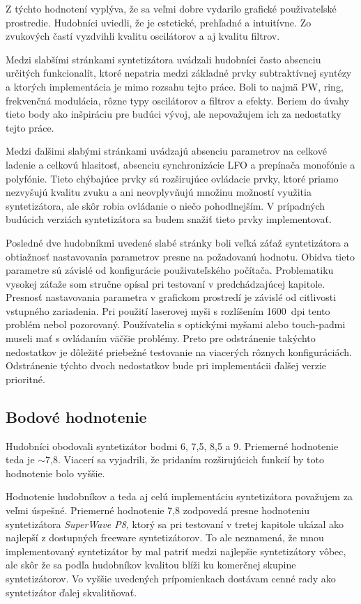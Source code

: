 Z týchto hodnotení vyplýva, že sa veľmi dobre vydarilo grafické použivateľské prostredie. Hudobníci uviedli, že je estetické, prehľadné a intuitívne. Zo zvukových častí vyzdvihli kvalitu oscilátorov a aj kvalitu filtrov. 

Medzi slabšími stránkami syntetizátora uvádzali hudobníci často absenciu určitých funkcionalít, ktoré nepatria medzi základné prvky subtraktívnej syntézy a ktorých implementácia je mimo rozsahu tejto práce. Boli to najmä PW, ring, frekvenčná modulácia, rôzne typy oscilátorov a filtrov a efekty. Beriem do úvahy tieto body ako inšpiráciu pre budúci vývoj, ale nepovažujem ich za nedostatky tejto práce.

Medzi ďalšimi slabými stránkami uvádzajú absenciu parametrov na celkové ladenie a celkovú hlasitosť, absenciu synchronizácie LFO a prepínača monofónie a polyfónie. Tieto chýbajúce prvky sú rozširujúce ovládacie prvky, ktoré priamo nezvyšujú kvalitu zvuku a ani neovplyvňujú množinu možností využitia syntetizátora, ale skôr robia ovládanie o niečo pohodlnejším. V prípadných budúcich verziách syntetizátora sa budem snažiť tieto prvky implementovať.

Posledné dve hudobníkmi uvedené slabé stránky boli veľká záťaž syntetizátora a obtiažnosť nastavovania parametrov presne na požadovanú hodnotu. Obidva tieto parametre sú závislé od konfigurácie použivateľského počítača. Problematiku vysokej záťaže som stručne opísal pri testovaní v predchádzajúcej kapitole. Presnosť nastavovania parametra v grafickom prostredí je závislé od citlivosti vstupného zariadenia. Pri použití laserovej myši s rozlíšením 1600~dpi tento problém nebol pozorovaný. Používatelia s optickými myšami alebo touch-padmi museli mať s ovládaním väčšie problémy. Preto pre odstránenie takýchto nedostatkov je dôležité priebežné testovanie na viacerých rôznych konfiguráciách. Odstránenie týchto dvoch nedostatkov bude pri implementácii ďalšej verzie prioritné.

\subsection{Bodové hodnotenie}

Hudobníci obodovali syntetizátor bodmi 6, 7,5, 8,5 a 9. Priemerné hodnotenie teda je $\sim$7,8. Viacerí sa vyjadrili, že pridaním rozširujúcich funkcií by toto hodnotenie bolo vyššie. 

Hodnotenie hudobníkov a teda aj celú implementáciu syntetizátora považujem za veľmi úspešné. Priemerné hodnotenie 7,8 zodpovedá presne hodnoteniu syntetizátora \emph{SuperWave P8}, ktorý sa pri testovaní v tretej kapitole ukázal ako najlepší z dostupných freeware syntetizátorov. To ale neznamená, že mnou implementovaný syntetizátor by mal patriť medzi najlepšie syntetizátory vôbec, ale skôr že sa podľa hudobníkov kvalitou blíži ku komerčnej skupine syntetizátorov. Vo vyššie uvedených prípomienkach dostávam cenné rady ako syntetizátor ďalej skvalitňovať.


